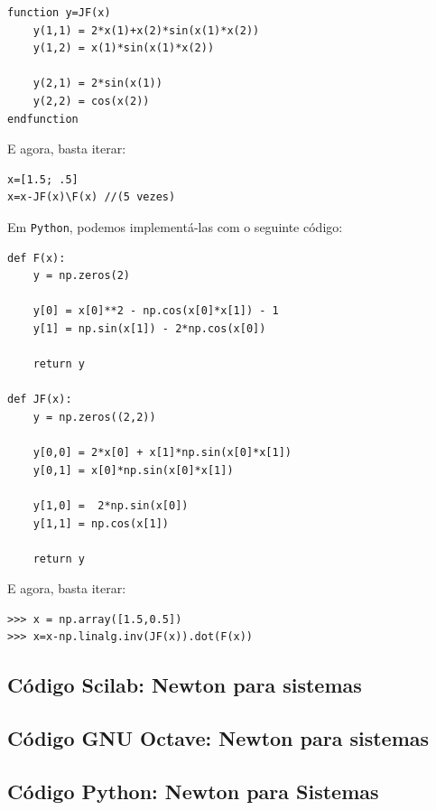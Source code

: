 \begin{sol}
\begin{verbatim}
function y=JF(x)
    y(1,1) = 2*x(1)+x(2)*sin(x(1)*x(2)) 
    y(1,2) = x(1)*sin(x(1)*x(2))

    y(2,1) = 2*sin(x(1)) 
    y(2,2) = cos(x(2))
endfunction
\end{verbatim}

E agora, basta iterar:
\begin{verbatim}
x=[1.5; .5]
x=x-JF(x)\F(x) //(5 vezes)
\end{verbatim}  
\fi
\ifispython
Em \verb+Python+, podemos implementá-las com o seguinte código:
\begin{verbatim}
def F(x):
    y = np.zeros(2)
    
    y[0] = x[0]**2 - np.cos(x[0]*x[1]) - 1
    y[1] = np.sin(x[1]) - 2*np.cos(x[0])
    
    return y

def JF(x):
    y = np.zeros((2,2))
    
    y[0,0] = 2*x[0] + x[1]*np.sin(x[0]*x[1])
    y[0,1] = x[0]*np.sin(x[0]*x[1])

    y[1,0] =  2*np.sin(x[0])
    y[1,1] = np.cos(x[1])

    return y
\end{verbatim}

E agora, basta iterar:
\begin{verbatim}
>>> x = np.array([1.5,0.5])
>>> x=x-np.linalg.inv(JF(x)).dot(F(x))
\end{verbatim}  
\fi
\end{sol}

\ifisscilab
\subsection{Código Scilab: Newton para sistemas}


\fi
\ifisoctave
\subsection{Código GNU Octave: Newton para sistemas}


\fi
\ifispython
\subsection{Código Python: Newton para Sistemas}

